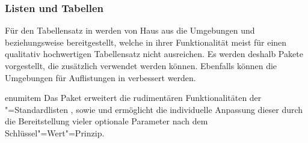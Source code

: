 \subsubsection{Listen und Tabellen}
Für den Tabellensatz in  werden von Haus aus die Umgebungen 
 und  beziehungsweise 
 bereitgestellt, welche in ihrer Funktionalität meist 
für einen qualitativ hochwertigen Tabellensatz nicht ausreichen. Es werden 
deshalb Pakete vorgestellt, die zusätzlich verwendet werden können. Ebenfalls 
können die Umgebungen für Auflistungen in  verbessert werden.

\begin{packages}
\item[enumitem]
  Das Paket  erweitert die rudimentären Funktionalitäten der 
  "=Standardlisten , 
  sowie  und ermöglicht die individuelle Anpassung 
  dieser durch die Bereitstellung vieler optionale Parameter nach dem
  Schlüssel"=Wert"=Prinzip. 
  

\end{packages}
